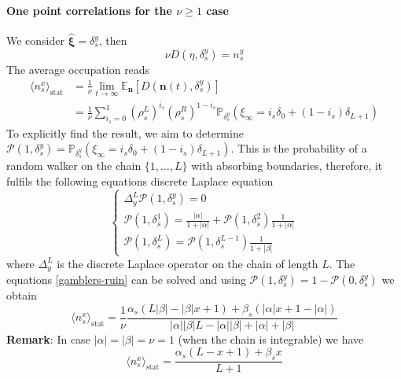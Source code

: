 \documentclass[10pt]{article}
\numberwithin{equation}{section}
\numberwithin{equation}{subsection}
\begin{document}
\paragraph{One point correlations for the $\nu\geq 1$ case}
We consider $\widehat{\bm{\xi}}=\delta_{s}^{y}$, then 
\begin{equation}
	\nu D(\eta,\delta_{s}^{y})=n_{s}^{y}
\end{equation}
The average occupation reads
\begin{equation}\label{OnePtsCORR}
	\begin{split}
		\langle n_{s}^{x}\rangle_{\text{stat}}&=\frac{1}{\nu}\lim_{t\to\infty}\mathbb{E}_{\bm{n}}\left[D(\bm{n}(t),\delta_{s}^{y})\right]\\&=\frac{1}{\nu}\sum_{i_{s}=0}^{1}\left(\rho_{s}^{L}\right)^{i_{s}}\left(\rho_{s}^{R}\right)^{1-i_{s}}\mathbb{P}_{\delta_{s}^{y}}\left(\xi_{\infty}=i_{s}\delta_{0}+(1-i_{s})\delta_{L+1}\right)
	\end{split}
\end{equation}
To explicitly find the result, we aim to determine $\mathcal{P}(1,\delta_{s}^{y})=\mathbb{P}_{\delta_{s}^{y}}\left(\xi_{\infty}=i_{s}\delta_{0}+(1-i_{s})\delta_{L+1}\right)$. This is the probability of a random walker on the chain $\{1,\ldots,L\}$ with absorbing boundaries, therefore, it fulfils the following equations discrete Laplace equation
\begin{equation}\label{gamblers-ruin}
	\begin{cases}
		\Delta_{y}^{L}\mathcal{P}(1,\delta_{s}^{y})=0\\
		\mathcal{P}(1,\delta_{s}^{1})=\frac{|\alpha|}{1+|\alpha|}+\mathcal{P}(1,\delta_{s}^{2})\frac{1}{1+|\alpha|}\\
		\mathcal{P}(1,\delta_{s}^{L})=\mathcal{P}(1,\delta_{s}^{L-1})\frac{1}{1+|\beta|}
	\end{cases}
\end{equation}
where $\Delta_{y}^{L}$ is the discrete Laplace operator on the chain of length $L$. The equations \eqref{gamblers-ruin} can be solved and using $\mathcal{P}(1,\delta_{s}^{y})=1-\mathcal{P}(0,\delta_{s}^{y})$ we obtain 
\begin{equation}
	\langle n_{s}^{x}\rangle_{\text{stat}}=\frac{1}{\nu}\frac{\alpha_{s}(L|\beta|-|\beta|x+1)+\beta_{s}(|\alpha|x+1-|\alpha|)}{|\alpha||\beta|L-|\alpha||\beta|+|\alpha|+|\beta|}
\end{equation}
\textbf{Remark}: In case $|\alpha|=|\beta|=\nu=1$ (when the chain is integrable) we have 
\begin{equation}
	\langle n_{s}^{x}\rangle_{\text{stat}}=\frac{\alpha_{s}(L-x+1)+\beta_{s}x}{L+1}
\end{equation}
\end{document}
